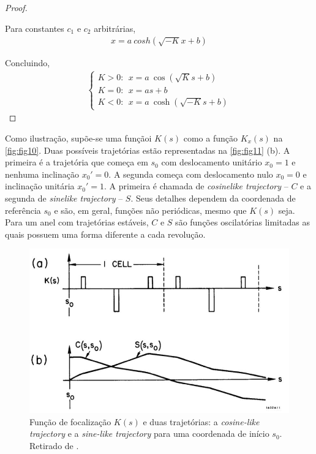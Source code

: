 \begin{proof}
\begin{itemize}
		Para constantes $c_1$ e $c_2$ arbitrárias,
		\begin{align*}
          x = a \ cosh(\sqrt{-K}x + b)
		\end{align*}
	\end{itemize}
	
	Concluindo,
	\begin{align*}
        \left\{\begin{array}{l}
        K>0: \ \ x = a\ \cos(\sqrt{K}s+b) \\
        K=0: \ \ x = as+b \\
        K<0: \ \ x = a\ \cosh(\sqrt{-K}s+b)
        \end{array}\right.
	\end{align*}
\end{proof}

Como ilustração, supõe-se uma funçãoi $K(s)$ como a função $K_x(s)$ na \autoref{fig:fig10}. Duas possíveis trajetórias estão representadas na \autoref{fig:fig11} (b). A primeira é a trajetória que começa em $s_0$ com deslocamento unitário $x_0=1$ e nenhuma inclinação $x_0'=0$. A segunda começa com deslocamento nulo $x_0=0$ e inclinação unitária $x_0'= 1$. A primeira é chamada de \textit{cosinelike trajectory} -- $C$ e a segunda de \textit{sinelike trajectory} -- $S$. Seus detalhes dependem da coordenada de referência $s_0$ e são, em geral, funções não periódicas, mesmo que $K(s)$ seja. Para um anel com trajetórias estáveis, $C$ e $S$ são funções oscilatórias limitadas as quais possuem uma forma diferente a cada revolução.

\begin{figure}[!htb]
	\centering
	\includegraphics[width=0.7\linewidth]{./Figuras/fig11.jpeg}
	\caption{Função de focalização $K(s)$ e duas trajetórias: a \textit{cosine-like trajectory} e a \textit{sine-like trajectory} para uma coordenada de início $s_0 $. Retirado de \cite{sands1970physics}.}
	\label{fig:fig11}
\end{figure}
	
